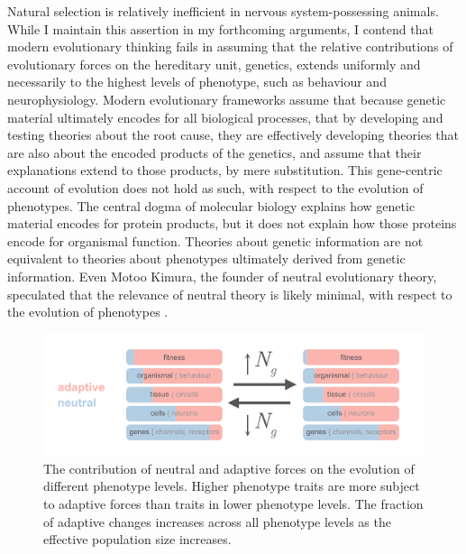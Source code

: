 \documentclass{article}
\begin{document}
Natural selection is relatively inefficient in nervous system-possessing animals. While I maintain this assertion in my forthcoming arguments, I contend that modern evolutionary thinking fails in assuming that the relative contributions of evolutionary forces on the hereditary unit, genetics, extends uniformly and necessarily to the highest levels of phenotype, such as behaviour and neurophysiology. Modern evolutionary frameworks assume that because genetic material ultimately encodes for all biological processes, that by developing and testing theories about the root cause, they are effectively developing theories that are also about the encoded products of the genetics, and assume that their explanations extend to those products, by mere substitution. This gene-centric account of evolution does not hold as such, with respect to the evolution of phenotypes. The central dogma of molecular biology \cite{crick_1970} explains how genetic material encodes for protein products, but it does not explain how those proteins encode for organismal function. Theories about genetic information are not equivalent to theories about phenotypes ultimately derived from genetic information. Even Motoo Kimura, the founder of neutral evolutionary theory, speculated that the relevance of neutral theory is likely minimal, with respect to the evolution of phenotypes \cite{kimura1983neutral, zhang_2018}. 

\begin{figure}[htp]
\centering
\includegraphics[width=17 cm]{fig_3.png}
\caption{The contribution of neutral and adaptive forces on the evolution of different phenotype levels. Higher phenotype traits are more subject to adaptive forces than traits in lower phenotype levels. The fraction of adaptive changes increases across all phenotype levels as the effective population size increases.}
\end{figure}
\end{document}
